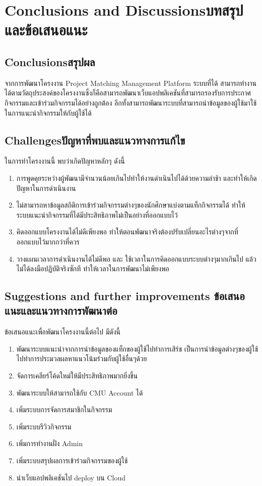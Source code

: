 \chapter{\ifenglish Conclusions and Discussions\else บทสรุปและข้อเสนอแนะ\fi}

\section{\ifenglish Conclusions\else สรุปผล\fi}

\hspace{4ex} 
จากการพัฒนาโครงงาน Project Matching Management Platform ระบบที่ได้ สามารถทำงานได้ตามวัตถุประสงค์ของโครงงานซึ่งก็คือสามารถพัฒนาเว็บแอปพลิเคชันที่สามารถรองรับการประกาศกิจกรรมและเข้าร่วมกิจกรรมได้อย่างถูกต้อง อีกทั้งสามารถพัฒนาระบบที่สามารถนำข้อมูลของผู้ใช้มาใช้ในการแนะนำกิจกรรมให้กับผู้ใช้ได้

\section{\ifenglish Challenges\else ปัญหาที่พบและแนวทางการแก้ไข\fi}

ในการทำโครงงานนี้ พบว่าเกิดปัญหาหลักๆ ดังนี้
\begin{enumerate}
    \item การพูดคุยระหว่างผู้พัฒนามีจำนวนน้อยเกินไปทำให้งานดำเนินไปได้ด้วยความล่าช้า และทำให้เกิดปัญหาในการดำเนินงาน
    \item ไม่สามารถหาข้อมูลสถิติการเข้าร่วมกิจกรรมต่างๆของนักศึกษาแบ่งตามแท็กกิจกรรมได้ ทำให้ระบบแนะนำกิจกรรมที่ได้มีประสิทธิภาพไม่เป็นอย่างที่ออกแบบไว้
    \item คิดออกแบบโครงงานได้ไม่ดีเพียงพอ ทำให้ตอนพัฒนาจริงต้องปรับเปลี่ยนอะไรต่างๆจากที่ออกแบบไว้มากกว่าที่ควร
    \item วางแผนเวลาการดำเนินงานได้ไม่ดีพอ และ ใช้เวลาในการคิดออกแบบระบบต่างๆมากเกินไป แล้วไม่ได้ลงมือปฏิบัติจริงซักที ทำให้เวลาในการพัฒนาไม่เพียงพอ
\end{enumerate}

\section{\ifenglish%
Suggestions and further improvements
\else%
ข้อเสนอแนะและแนวทางการพัฒนาต่อ
\fi
}

ข้อเสนอแนะเพื่อพัฒนาโครงงานนี้ต่อไป มีดังนี้

\begin{enumerate}
    \item พัฒนาระบบแนะนำจากการนำข้อมูลของแท็กของผู้ใช้ไปทำการเสิร์ช เป็นการนำข้อมูลต่างๆของผู้ใช้ไปทำการประมวลผลหาแนวโน้มร่วมกับผู้ใช้อื่นๆด้วย
    \item จัดการเคลียร์โค้ดใหม่ให้มีประสิทธิภาพมากยิ่งขึ้น 
    \item พัฒนาระบบให้สามารถใช้กับ CMU Account ได้
    \item เพิ่มระบบการจัดการสมาชิกในกิจกรรม
    \item เพิ่มระบบรีวิวกิจกรรม
    \item เพิ่มการทำงานฝั่ง Admin
    \item เพิ่มระบบสรุปผลการเข้าร่วมกิจกรรมของผู้ใช้
    \item นำเว็บแอปพลิเคชันไป deploy บน Cloud
\end{enumerate}
